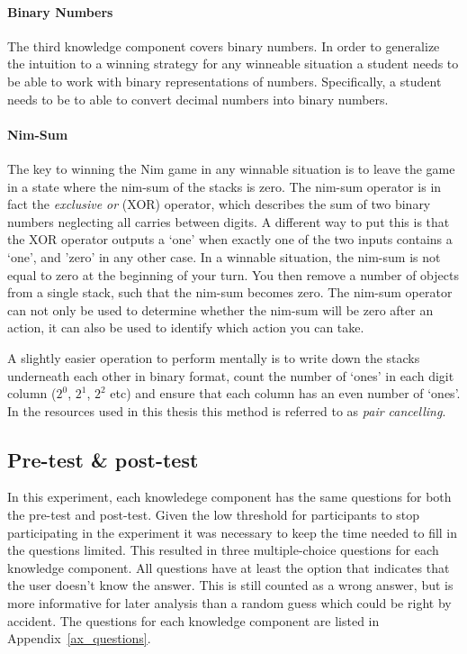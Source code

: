 \paragraph{Binary Numbers} The third knowledge component covers binary numbers.
In order to generalize the intuition to a winning strategy
for any winneable situation a student needs to be able to work with binary
representations of numbers. Specifically, a student needs to be to able to
convert decimal numbers into binary numbers.
\paragraph{Nim-Sum}
The key to winning the Nim game in any winnable situation is to leave the game
in a state where the nim-sum of the stacks is zero. The nim-sum operator is in
fact the \emph{exclusive or} (XOR) operator, which describes the sum of two
binary numbers neglecting all carries between digits. A different way to put
this is that the XOR operator outputs a `one' when exactly one of the two
inputs contains a `one', and 'zero' in any other case. In a winnable situation,
the nim-sum is not equal to zero at the beginning of your turn. You then remove a
number of objects from a single stack, such that the nim-sum becomes zero.
The nim-sum operator can not only be used to determine whether the nim-sum will
be zero after an action, it can also be used to identify which action you can take.

A slightly easier operation to perform mentally is to write down the stacks
underneath each other in binary format, count the number of `ones' in each
digit column ($2^0$, $2^1$, $2^2$ etc) and ensure that each column has an even
number of `ones'. In the resources used in this thesis this method is referred
to as \emph{pair cancelling}.
\subsection{Pre-test \& post-test}
\label{sec:setup_tests}
In this experiment, each knowledege component has the same questions for both
the pre-test and post-test. Given the low threshold for participants to stop
participating in the experiment it was necessary to keep the time needed to
fill in the questions limited. This resulted in three multiple-choice
questions for each knowledge component. All questions have at least the option that
indicates that the user doesn't know the answer. This is still counted as a
wrong answer, but is more informative for later analysis than a random guess
which could be right by accident. The questions for each knowledge component
are listed in Appendix~\ref{ax_questions}.

